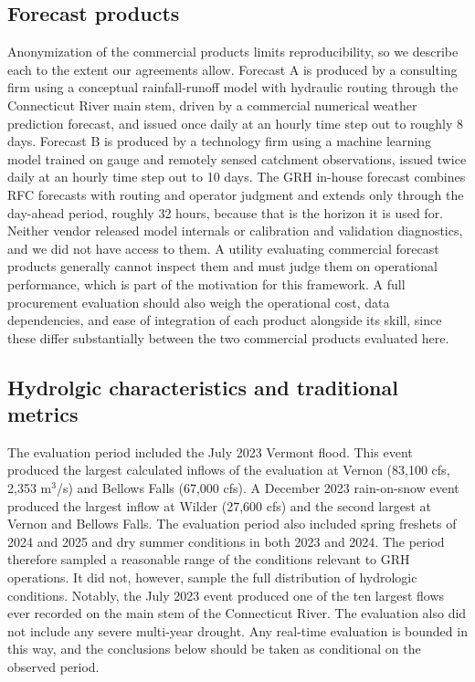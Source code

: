 \documentclass[MLA]{USG} %
\begin{document}
\subsection{Forecast products}\label{sec:products}

Anonymization of the commercial products limits reproducibility, so we describe each to the extent our agreements allow. Forecast A is produced by a consulting firm using a conceptual rainfall-runoff model with hydraulic routing through the Connecticut River main stem, driven by a commercial numerical weather prediction forecast, and issued once daily at an hourly time step out to roughly 8 days. Forecast B is produced by a technology firm using a machine learning model trained on gauge and remotely sensed catchment observations, issued twice daily at an hourly time step out to 10 days. The GRH in-house forecast combines RFC forecasts with routing and operator judgment and extends only through the day-ahead period, roughly 32 hours, because that is the horizon it is used for. Neither vendor released model internals or calibration and validation diagnostics, and we did not have access to them. A utility evaluating commercial forecast products generally cannot inspect them and must judge them on operational performance, which is part of the motivation for this framework. A full procurement evaluation should also weigh the operational cost, data dependencies, and ease of integration of each product alongside its skill, since these differ substantially between the two commercial products evaluated here.

\subsection{Hydrolgic characteristics and traditional metrics}\label{sec:period}

The evaluation period included the July 2023 Vermont flood. This event produced the largest calculated inflows of the evaluation at Vernon (83,100 cfs, 2,353 m$^3$/s) and Bellows Falls (67,000 cfs). A December 2023 rain-on-snow event produced the largest inflow at Wilder (27,600 cfs) and the second largest at Vernon and Bellows Falls. The evaluation period also included spring freshets of 2024 and 2025 and dry summer conditions in both 2023 and 2024. The period therefore sampled a reasonable range of the conditions relevant to GRH operations. It did not, however, sample the full distribution of hydrologic conditions. Notably, the July 2023 event produced one of the ten largest flows ever recorded on the main stem of the Connecticut River. The evaluation also did not include any severe multi-year drought. Any real-time evaluation is bounded in this way, and the conclusions below should be taken as conditional on the observed period. 
\end{document}
